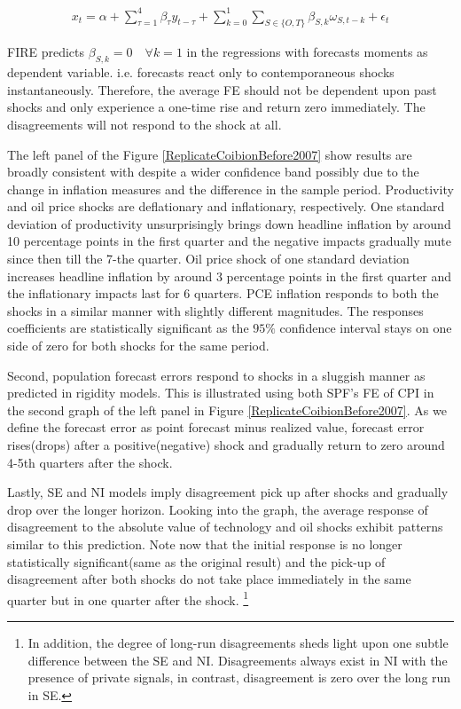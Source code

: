 \documentclass[12pt]{article}
\begin{document}
	\begin{eqnarray}\label{IRRegression}
		x_{t}  = \alpha + \sum^4_{\tau=1} \beta_{\tau} y_{t-\tau} +  \sum^1_{k=0} \sum_{S \in \{O,T\}}\beta_{S,k}\omega_{S,t-k} + \epsilon_t 
	\end{eqnarray}
	
	FIRE predicts $\beta_{S,k}=0\quad \forall k=1$ in the regressions with forecasts moments as dependent variable. i.e. forecasts react only to contemporaneous shocks instantaneously. Therefore, the average FE should not be dependent upon past shocks and only experience a one-time rise and return zero immediately. The disagreements will not respond to the shock at all. 
	
	The left panel of the Figure \ref{ReplicateCoibionBefore2007} show results are broadly consistent with \citet{coibion2012can} despite a wider confidence band possibly due to the change in inflation measures and the difference in the sample period. Productivity and oil price shocks are deflationary and inflationary, respectively. One standard deviation of productivity unsurprisingly brings down headline inflation by around 10 percentage points in the first quarter and the negative impacts gradually mute since then till the 7-the quarter. Oil price shock of one standard deviation increases headline inflation by around 3 percentage points in the first quarter and the inflationary impacts last for 6 quarters. PCE inflation responds to both the shocks in a similar manner with slightly different magnitudes. The responses coefficients are statistically significant as the $95\%$ confidence interval stays on one side of zero for both shocks for the same period. 
	
	Second, population forecast errors respond to shocks in a sluggish manner as predicted in rigidity models. This is illustrated using both SPF's FE of CPI in the second graph of the left panel in Figure \ref{ReplicateCoibionBefore2007}. As we define the forecast error as point forecast minus realized value, forecast error rises(drops) after a positive(negative) shock and gradually return to zero around 4-5th quarters after the shock. 
	
	Lastly, SE and NI models imply disagreement pick up after shocks and gradually drop over the longer horizon.  Looking into the graph, the average response of disagreement to the absolute value of technology and oil shocks exhibit patterns similar to this prediction. Note now that the initial response is no longer statistically significant(same as the original result) and the pick-up of disagreement after both shocks do not take place immediately in the same quarter but in one quarter after the shock. \footnote{In addition, the degree of long-run disagreements sheds light upon one subtle difference between the SE and NI. Disagreements always exist in NI with the presence of private signals, in contrast, disagreement is zero over the long run in SE. }
	
\end{document}
